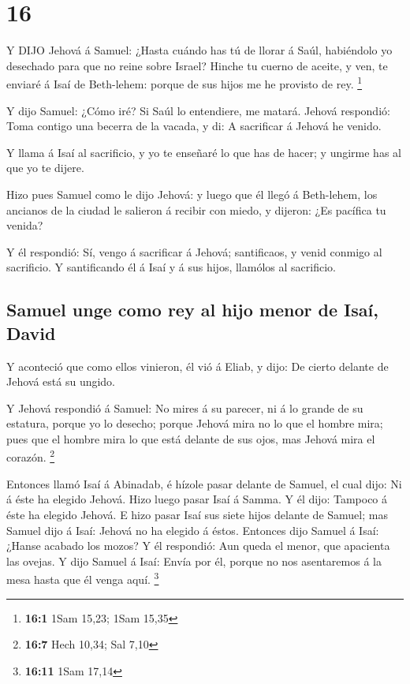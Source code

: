 \hypertarget{section-15}{%
\section{16}\label{section-15}}

 Y DIJO Jehová á Samuel: ¿Hasta cuándo has tú de llorar á
Saúl, habiéndolo yo desechado para que no reine sobre Israel? Hinche tu
cuerno de aceite, y ven, te enviaré á Isaí de Beth-lehem: porque de sus
hijos me he provisto de rey. \footnote{\textbf{16:1} 1Sam 15,23; 1Sam
  15,35}

 Y dijo Samuel: ¿Cómo iré? Si Saúl lo entendiere, me matará.
Jehová respondió: Toma contigo una becerra de la vacada, y di: A
sacrificar á Jehová he venido.

 Y llama á Isaí al sacrificio, y yo te enseñaré lo que has
de hacer; y ungirme has al que yo te dijere.

 Hizo pues Samuel como le dijo Jehová: y luego que él llegó
á Beth-lehem, los ancianos de la ciudad le salieron á recibir con miedo,
y dijeron: ¿Es pacífica tu venida?

 Y él respondió: Sí, vengo á sacrificar á Jehová;
santificaos, y venid conmigo al sacrificio. Y santificando él á Isaí y á
sus hijos, llamólos al sacrificio.

\hypertarget{samuel-unge-como-rey-al-hijo-menor-de-isauxed-david}{%
\subsection{Samuel unge como rey al hijo menor de Isaí,
David}\label{samuel-unge-como-rey-al-hijo-menor-de-isauxed-david}}

 Y aconteció que como ellos vinieron, él vió á Eliab, y
dijo: De cierto delante de Jehová está su ungido.

 Y Jehová respondió á Samuel: No mires á su parecer, ni á lo
grande de su estatura, porque yo lo desecho; porque Jehová mira no lo
que el hombre mira; pues que el hombre mira lo que está delante de sus
ojos, mas Jehová mira el corazón. \footnote{\textbf{16:7} Hech 10,34;
  Sal 7,10}

 Entonces llamó Isaí á Abinadab, é hízole pasar delante de
Samuel, el cual dijo: Ni á éste ha elegido Jehová.  Hizo
luego pasar Isaí á Samma. Y él dijo: Tampoco á éste ha elegido Jehová.
 E hizo pasar Isaí sus siete hijos delante de Samuel; mas
Samuel dijo á Isaí: Jehová no ha elegido á éstos.  Entonces
dijo Samuel á Isaí: ¿Hanse acabado los mozos? Y él respondió: Aun queda
el menor, que apacienta las ovejas. Y dijo Samuel á Isaí: Envía por él,
porque no nos asentaremos á la mesa hasta que él venga aquí. \footnote{\textbf{16:11}
  1Sam 17,14}

